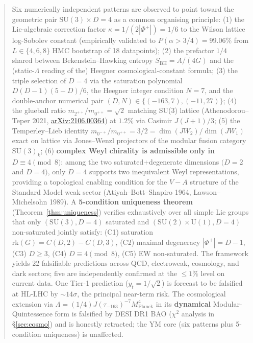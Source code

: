 \documentclass[11pt,a4paper]{article}
\newcommand{\SU}{\mathrm{SU}}
\newcommand{\Uone}{\mathrm{U}(1)}
\newcommand{\Planck}{\mathrm{Planck}}
\newcommand{\MP}{M_{\Planck}}
\newcommand{\BH}{\mathrm{BH}}
\newcommand{\rk}{\mathrm{rk}}
\newcommand{\Phiplus}{\Phi^{+}}
\begin{document}
\begin{abstract}
Six numerically independent patterns are observed to point toward the geometric pair $\SU(3) \times D = 4$ as a common organising principle: (1) the Lie-algebraic correction factor $\kappa = 1/(2|\Phiplus|) = 1/6$ to the Wilson lattice log-Sobolev constant (empirically validated to $P(\alpha > 3/4) = 99.06\%$ from $L \in \{4,6,8\}$ HMC bootstrap of 18 datapoints); (2) the prefactor $1/4$ shared between Bekenstein--Hawking entropy $S_{\BH} = A/(4G)$ and the (static-$\Lambda$ reading of the) Heegner cosmological-constant formula; (3) the triple selection of $D = 4$ via the saturation polynomial $D(D-1)(5-D)/6$, the Heegner integer condition $N = 7$, and the double-anchor numerical pair $(D, N) \in \{(-163, 7), (-11, 27)\}$; (4) the glueball ratio $m_{2^{++}} / m_{0^{++}} = \sqrt{2}$ matching SU(3) lattice (Athenodorou--Teper 2021, \href{https://arxiv.org/abs/2106.00364}{arXiv:2106.00364}) at $1.2\%$ via Casimir $J(J+1)/3$; (5) the Temperley--Lieb identity $m_{0^{-+}} / m_{0^{++}} = 3/2 = \dim(JW_2)/\dim(JW_1)$ exact on lattice via Jones--Wenzl projectors of the modular fusion category $\SU(3)_k$; (6) \textbf{complex Weyl chirality is admissible only in $D \equiv 4 \pmod 8$}: among the two saturated+degenerate dimensions $(D = 2$ and $D = 4)$, only $D = 4$ supports two inequivalent Weyl representations, providing a topological enabling condition for the $V - A$ structure of the Standard Model weak sector (Atiyah--Bott--Shapiro 1964, Lawson--Michelsohn 1989). A \textbf{5-condition uniqueness theorem} (Theorem~\ref{thm:uniqueness}) verifies exhaustively over all simple Lie groups that only $(\SU(3), D = 4)$ saturated and $(\SU(2) \times \Uone, D = 4)$ non-saturated jointly satisfy: (C1) saturation $\rk(G) = C(D, 2) - C(D, 3)$, (C2) maximal degeneracy $|\Phiplus| = D - 1$, (C3) $D \geq 3$, (C4) $D \equiv 4 \pmod 8$, (C5) EW non-saturated. The framework yields 22 falsifiable predictions across QCD, electroweak, cosmology, and dark sectors; five are independently confirmed at the $\leq 1\%$ level on current data. One Tier-1 prediction ($y_t = 1/\sqrt{2}$) is forecast to be falsified at HL-LHC by $\sim 14\sigma$, the principal near-term risk. The cosmological extension via $\Lambda = (1/4) J(\tau_{-163})^{-7} \MP^4$ in its \textbf{dynamical} Modular-Quintessence form is falsified by DESI DR1 BAO ($\chi^2$ analysis in \S\ref{sec:cosmo}) and is honestly retracted; the YM core (six patterns plus 5-condition uniqueness) is unaffected.
\end{abstract}
\end{document}
